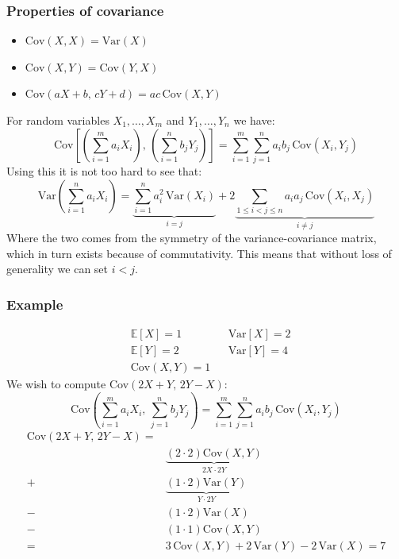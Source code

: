 \documentclass[12pt]{article}
\begin{document}
\subsubsection{Properties of covariance}
\begin{itemize}
    \item \(\text{Cov}(X,X)=\text{Var}(X)\)
    \item \(\text{Cov}(X,Y)=\text{Cov}(Y,X)\)
    \item \(\text{Cov}(aX+b,\,cY+d)=ac\,\text{Cov}(X,Y)\)
\end{itemize}
For random variables \(X_1,\dots,X_m\) and \(Y_1,\dots,Y_n\) we have:
\[\text{Cov}\left[\left(\sum^m_{i=1}a_iX_i\right),\,\left(\sum^n_{i=1}b_jY_j\right)\right]=\sum^m_{i=1}\sum^n_{j=1}a_ib_j\,\text{Cov}(X_i,Y_j)\]
Using this it is not too hard to see that:
\[\text{Var}\left(\sum^n_{i=1}a_iX_i\right)=\underbrace{\sum^n_{i=1}a_i^2\,\text{Var}(X_i)}_{i=j}+2\underbrace{\sum_{1\leq i< j\leq n}a_ia_j\,\text{Cov}(X_i,X_j)}_{i\ne j}\]
Where the two comes from the symmetry of the variance-covariance matrix, which in turn exists because of commutativity. This means that without loss of generality we can set \(i<j\).
\subsubsection*{Example}
\begin{align*}
    &\mathbb{E}[X]=1 && \text{Var}[X]=2 \\
    &\mathbb{E}[Y]=2 && \text{Var}[Y]=4 \\
    &\text{Cov}(X,Y)= 1
\end{align*}
We wish to compute Cov\((2X+Y,\,2Y-X)\):
\[\text{Cov}\left(\sum^m_{i=1}a_iX_i,\, \sum^n_{j=1}b_jY_j\right)=\sum^m_{i=1}\sum^n_{j=1}a_ib_j\, \text{Cov}(X_i,Y_j)\]
\begin{align*}
    \text{Cov}(2X+Y,\,2Y-X)=&\\ 
    &\underbrace{(2\cdot2)\text{Cov}(X,Y)}_{2X\cdot2Y} \\
    +&\underbrace{(1\cdot2)\text{Var}(Y)}_{Y\cdot 2Y} \\
    -&(1\cdot2)\text{Var}(X) \\
    -&(1\cdot1)\text{Cov}(X,Y)\\
    =&3\,\text{Cov}(X,Y)+2\,\text{Var}(Y)-2\,\text{Var}(X)=7
\end{align*}
\end{document}
